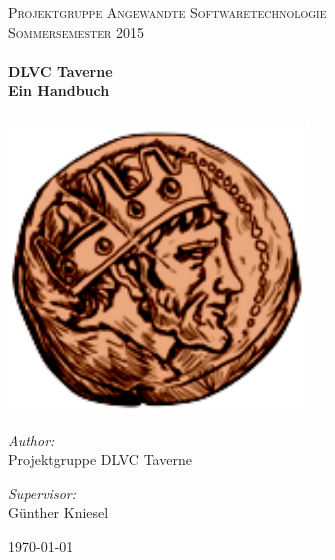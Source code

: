 \begin{titlepage}

\begin{center}



\textsc{\LARGE Projektgruppe Angewandte Softwaretechnologie}\\[1.5cm]

\textsc{\Large Sommersemester 2015}\\[0.5cm]

\HRule \\[0.4cm] { \huge \bfseries DLVC Taverne}\\[0.2cm]
{\large \bfseries Ein Handbuch}\\[0.4cm]

\HRule \\[1.5cm]

\includegraphics[width=0.6\textwidth]{./Logo3_1.png}\\[1cm]

\begin{minipage}{0.4\textwidth} \begin{flushleft} \large \emph{Author:}\\ Projektgruppe DLVC Taverne \end{flushleft} \end{minipage} \hfill \begin{minipage}{0.4\textwidth} \begin{flushright} \large \emph{Supervisor:} \\ Günther Kniesel \end{flushright} \end{minipage}

\vfill

{\large \today}

\end{center}

\end{titlepage}